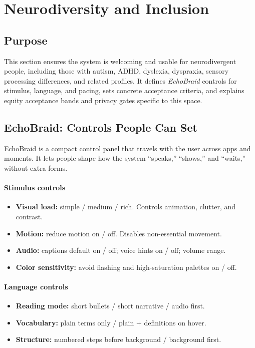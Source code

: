 \documentclass[12pt]{article}
\begin{document}


\section{Neurodiversity and Inclusion}

\subsection*{Purpose}
This section ensures the system is welcoming and usable for neurodivergent people, including those with autism, ADHD, dyslexia, dyspraxia, sensory processing differences, and related profiles. It defines \emph{EchoBraid} controls for stimulus, language, and pacing, sets concrete acceptance criteria, and explains equity acceptance bands and privacy gates specific to this space.

\subsection*{EchoBraid: Controls People Can Set}
EchoBraid is a compact control panel that travels with the user across apps and moments. It lets people shape how the system “speaks,” “shows,” and “waits,” without extra forms.

\paragraph{Stimulus controls}
\begin{itemize}[leftmargin=*]
  \item \textbf{Visual load:} simple / medium / rich. Controls animation, clutter, and contrast.
  \item \textbf{Motion:} reduce motion on / off. Disables non-essential movement.
  \item \textbf{Audio:} captions default on / off; voice hints on / off; volume range.
  \item \textbf{Color sensitivity:} avoid flashing and high-saturation palettes on / off.
\end{itemize}

\paragraph{Language controls}
\begin{itemize}[leftmargin=*]
  \item \textbf{Reading mode:} short bullets / short narrative / audio first.
  \item \textbf{Vocabulary:} plain terms only / plain + definitions on hover.
  \item \textbf{Structure:} numbered steps before background / background first.
\end{itemize}
\end{document}
